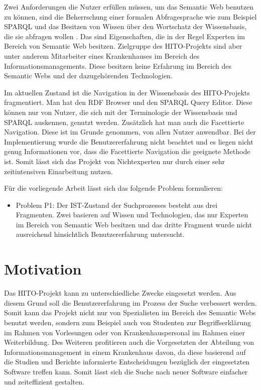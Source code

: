 Zwei Anforderungen die Nutzer erfüllen müssen, um das Semantic Web benutzen zu können, sind die Beherrschung einer formalen Abfragesprache wie zum Beispiel \ac{SPARQL} und das Besitzen von Wissen über den Wortschatz der Wissensbasis, die sie abfragen wollen \citep[vgl.]{hoffner2017survey}. 
Das sind Eigenschaften, die in der Regel Experten im Bereich von Semantic Web besitzen. 
Zielgruppe des HITO-Projekts sind aber unter anderem Mitarbeiter eines Krankenhauses im Bereich des Informationsmanagements.
Diese besitzen keine Erfahrung im Bereich des Semantic Webs und der dazugehörenden Technologien.

Im aktuellen Zustand ist die Navigation in der Wissensbasis des HITO-Projekts fragmentiert. 
Man hat den RDF Browser und den SPARQL Query Editor. 
Diese können nur von Nutzer, die sich mit der Terminologie der Wissensbasis und SPARQL auskennen, genutzt werden. 
Zusätzlich hat man auch die Facettierte Navigation. 
Diese ist im Grunde genommen, von allen Nutzer anwendbar. 
Bei der Implementierung wurde die Benutzererfahrung nicht beachtet und es liegen nicht genug Informationen vor, dass die Facettierte Navigation die geeignete Methode ist.
Somit lässt sich das Projekt von Nichtexperten nur durch einer sehr zeitintensiven Einarbeitung nutzen. 

Für die vorliegende Arbeit lässt sich das folgende Problem formulieren:

\begin{itemize}
\item Problem P1: Der IST-Zustand der Suchprozesses besteht aus drei Fragmenten. 
Zwei basieren auf Wissen und Technologien, das nur Experten im Bereich von Semantic Web besitzen und das dritte Fragment wurde nicht ausreichend hinsichtlich Benutzererfahrung untersucht.
\end{itemize}

\section{Motivation}\label{sec:motivation}

Das HITO-Projekt kann zu unterschiedliche Zwecke eingesetzt werden. Aus diesem Grund soll die Benutzererfahrung im Prozess der Suche verbessert werden. Somit kann das Projekt nicht nur von Spezialisten im Bereich des Semantic Webs benutzt werden, sondern zum Beispiel auch von Studenten zur Begriffserklärung im Rahmen von Vorlesungen oder von Krankenhauspersonal im Rahmen einer Weiterbildung. Des Weiteren profitieren auch die Vorgesetzten der Abteilung von Informationsmanagement in einem Krankenhaus davon, da diese basierend auf die Studien und Berichte informierte Entscheidungen bezüglich der eingesetzten Software treffen kann. Somit lässt sich die Suche nach neuer Software einfacher und zeiteffizient gestalten.

